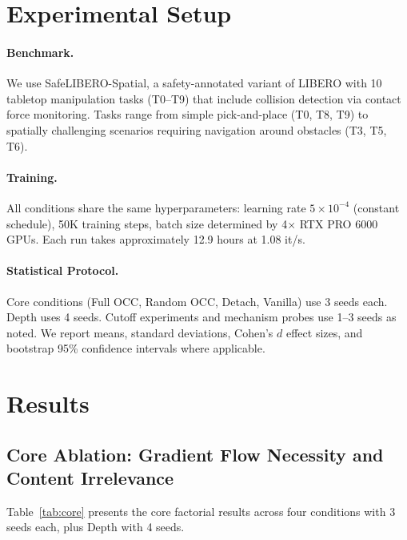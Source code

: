 \documentclass[10pt,letterpaper]{article}
\begin{document}
\section{Experimental Setup}
\label{sec:setup}

\paragraph{Benchmark.} We use SafeLIBERO-Spatial, a safety-annotated variant of LIBERO with 10 tabletop manipulation tasks (T0--T9) that include collision detection via contact force monitoring. Tasks range from simple pick-and-place (T0, T8, T9) to spatially challenging scenarios requiring navigation around obstacles (T3, T5, T6).

\paragraph{Training.} All conditions share the same hyperparameters: learning rate $5\!\times\!10^{-4}$ (constant schedule), 50K training steps, batch size determined by 4$\times$ RTX PRO 6000 GPUs. Each run takes approximately 12.9 hours at 1.08 it/s.

\paragraph{Statistical Protocol.} Core conditions (Full OCC, Random OCC, Detach, Vanilla) use 3 seeds each. Depth uses 4 seeds. Cutoff experiments and mechanism probes use 1--3 seeds as noted. We report means, standard deviations, Cohen's $d$ effect sizes, and bootstrap 95\% confidence intervals where applicable.

\section{Results}
\label{sec:results}

\subsection{Core Ablation: Gradient Flow Necessity and Content Irrelevance}
\label{sec:core}

Table~\ref{tab:core} presents the core factorial results across four conditions with 3 seeds each, plus Depth with 4 seeds.
\end{document}
